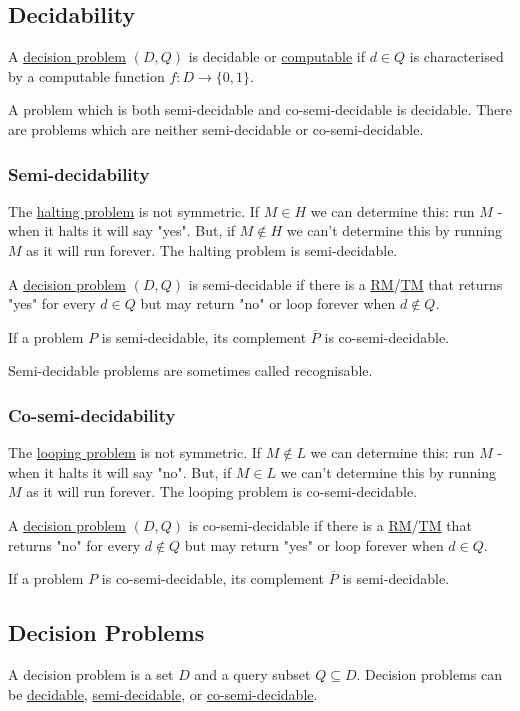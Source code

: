 \documentclass{article}
\begin{document}
\subsection{Decidability}\label{decidable}
A \hyperref[decision problem]{decision problem} $(D, Q)$ is decidable or \hyperref[computable]{computable} if $d \in Q$ is characterised by a computable function $f : D \to \{0, 1\}$.

A problem which is both semi-decidable and co-semi-decidable is decidable. There are problems which are neither semi-decidable or co-semi-decidable.

\subsubsection{Semi-decidability}\label{semi-decidable}
The \hyperref[halting]{halting problem} is not symmetric. If $M \in H$ we can determine this: run $M$ - when it halts it will say "yes". But, if $M \not \in H$ we can't determine this by running $M$ as it will run forever. The halting problem is semi-decidable.

A \hyperref[decision problem]{decision problem} $(D, Q)$ is semi-decidable if there is a \hyperref[rm]{RM}/\hyperref[tm]{TM} that returns "yes" for every $d \in Q$ but may return "no" or loop forever when $d \not \in Q$.

If a problem $P$ is semi-decidable, its complement $\overline P$ is co-semi-decidable.

Semi-decidable problems are sometimes called recognisable.

\subsubsection{Co-semi-decidability}\label{co-semi-decidable}
The \hyperref[looping]{looping problem} is not symmetric. If $M \not \in L$ we can determine this: run $M$ - when it halts it will say "no". But, if $M \in L$ we can't determine this by running $M$ as it will run forever. The looping problem is co-semi-decidable.

A \hyperref[decision problem]{decision problem} $(D, Q)$ is co-semi-decidable if there is a \hyperref[rm]{RM}/\hyperref[tm]{TM} that returns "no" for every $d \not \in Q$ but may return "yes" or loop forever when $d \in Q$.

If a problem $P$ is co-semi-decidable, its complement $\overline P$ is semi-decidable.


\subsection{Decision Problems}\label{decision-problem}
A decision problem is a set $D$ and a query subset $Q \subseteq D$. Decision problems can be \hyperref[decidable]{decidable}, \hyperref[semi-decidable]{semi-decidable}, or \hyperref[co-semi-decidable]{co-semi-decidable}.
\end{document}
